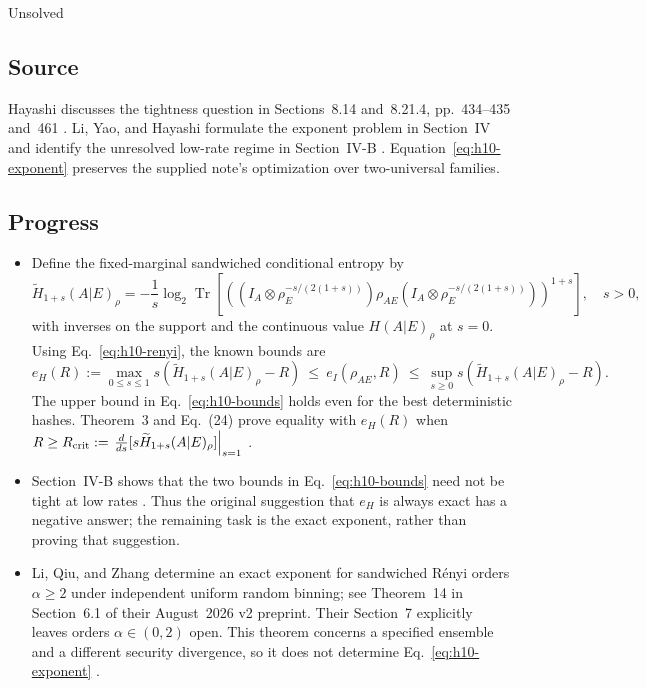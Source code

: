 Unsolved

\subsection*{Source}

Hayashi discusses the tightness question in Sections~8.14 and~8.21.4, pp.~434--435 and~461 . Li, Yao, and Hayashi formulate the exponent problem in Section~IV and identify the unresolved low-rate regime in Section~IV-B . Equation~\eqref{eq:h10-exponent} preserves the supplied note's optimization over two-universal families.

\subsection*{Progress}

\begin{itemize}
  \item Define the fixed-marginal sandwiched conditional entropy by
\begin{equation}
 \widetilde H_{1+s}(A|E)_\rho=-\frac1s\log_2\operatorname{Tr}\!\left[\left((I_A\otimes\rho_E^{-s/(2(1+s))})\rho_{AE}(I_A\otimes\rho_E^{-s/(2(1+s))})\right)^{1+s}\right],\quad s>0,
 \label{eq:h10-renyi}
\end{equation}
with inverses on the support and the continuous value $H(A|E)_\rho$ at $s=0$. Using Eq.~\eqref{eq:h10-renyi}, the known bounds are
\begin{equation}
 e_H(R):=\max_{0\leq s\leq1}s(\widetilde H_{1+s}(A|E)_\rho-R)\ \leq\ e_I(\rho_{AE},R)\ \leq\ \sup_{s\geq0}s(\widetilde H_{1+s}(A|E)_\rho-R).
 \label{eq:h10-bounds}
\end{equation}
The upper bound in Eq.~\eqref{eq:h10-bounds} holds even for the best deterministic hashes. Theorem~3 and Eq.~(24) prove equality with $e_H(R)$ when $R\geq R_{\rm crit}:=\left.\frac{d}{ds}[s\widetilde H_{1+s}(A|E)_\rho]\right|_{s=1}$ .

  \item Section~IV-B shows that the two bounds in Eq.~\eqref{eq:h10-bounds} need not be tight at low rates . Thus the original suggestion that $e_H$ is always exact has a negative answer; the remaining task is the exact exponent, rather than proving that suggestion.

  \item Li, Qiu, and Zhang determine an exact exponent for sandwiched R\'enyi orders $\alpha\geq2$ under independent uniform random binning; see Theorem~14 in Section~6.1 of their August~2026 v2 preprint. Their Section~7 explicitly leaves orders $\alpha\in(0,2)$ open. This theorem concerns a specified ensemble and a different security divergence, so it does not determine Eq.~\eqref{eq:h10-exponent} .
\end{itemize}

